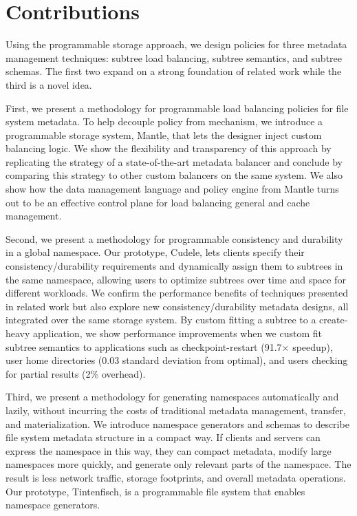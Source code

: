 \section{Contributions}

Using the programmable storage approach, we design policies for three metadata
management techniques: subtree load balancing, subtree semantics, and subtree
schemas.  The first two expand on a strong foundation of related work while the
third is a novel idea. 

First, we present a methodology for programmable load balancing policies for
file system metadata.  To help decouple policy from mechanism, we introduce a
programmable storage system, Mantle, that lets the designer inject custom
balancing logic. We show the flexibility and transparency of this approach by
replicating the strategy of a state-of-the-art metadata balancer and conclude
by comparing this strategy to other custom balancers on the same system. We
also show how the data management language and policy engine from Mantle turns
out to be an effective control plane for load balancing general and cache
management.

Second, we present a methodology for programmable consistency and durability in
a global namespace. Our prototype, Cudele, lets clients specify their
consistency/durability requirements and dynamically assign them to subtrees in
the same namespace, allowing users to optimize subtrees over time and space for
different workloads. We confirm the performance benefits of techniques
presented in related work but also explore new consistency/durability metadata
designs, all integrated over the same storage system. By custom fitting a
subtree to a create-heavy application, we show performance improvements when
we custom fit subtree semantics to applications such as checkpoint-restart
(91.7\(\times\) speedup), user home directories (0.03 standard deviation from
optimal), and users checking for partial results (2\% overhead).

Third, we present a methodology for generating namespaces automatically and
lazily, without incurring the costs of traditional metadata management,
transfer, and materialization.  We introduce namespace generators and schemas
to describe file system metadata structure in a compact way. If clients and
servers can express the namespace in this way, they can compact metadata,
modify large namespaces more quickly, and generate only relevant parts of the
namespace. The result is less network traffic, storage footprints, and overall
metadata operations.  Our prototype, Tintenfisch, is a programmable file system
that enables namespace generators.

